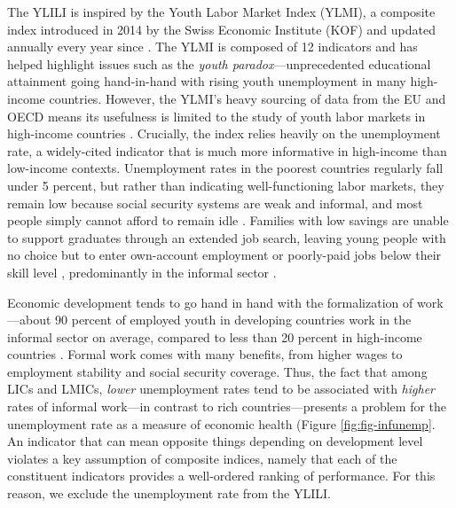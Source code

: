 \documentclass[
  a4paper, twoside, 12pt]{book}
\begin{document}
The YLILI is inspired by the Youth Labor Market Index (YLMI), a composite index introduced in 2014 by the Swiss Economic Institute (KOF) and updated annually every year since \autocite{renold2014}. The YLMI is composed of 12 indicators and has helped highlight issues such as the \emph{youth paradox}---unprecedented educational attainment going hand-in-hand with rising youth unemployment in many high-income countries. However, the YLMI's heavy sourcing of data from the EU and OECD means its usefulness is limited to the study of youth labor markets in high-income countries \autocite{pusterla2015,pusterla2016}. Crucially, the index relies heavily on the unemployment rate, a widely-cited indicator that is much more informative in high-income than low-income contexts. Unemployment rates in the poorest countries regularly fall under 5 percent, but rather than indicating well-functioning labor markets, they remain low because social security systems are weak and informal, and most people simply cannot afford to remain idle \autocite{filmer2014}. Families with low savings are unable to support graduates through an extended job search, leaving young people with no choice but to enter own-account employment or poorly-paid jobs below their skill level \autocite[margolis2014]{fields2012}, predominantly in the informal sector \autocite{herrera2013,sengenberger2011}.

Economic development tends to go hand in hand with the formalization of work \autocite{laporta2014}---about 90 percent of employed youth in developing countries work in the informal sector on average, compared to less than 20 percent in high-income countries \autocite{bonnet2018}. Formal work comes with many benefits, from higher wages to employment stability and social security coverage. Thus, the fact that among LICs and LMICs, \emph{lower} unemployment rates tend to be associated with \emph{higher} rates of informal work---in contrast to rich countries---presents a problem for the unemployment rate as a measure of economic health (Figure \ref{fig:fig-infunemp}. An indicator that can mean opposite things depending on development level violates a key assumption of composite indices, namely that each of the constituent indicators provides a well-ordered ranking of performance. For this reason, we exclude the unemployment rate from the YLILI.
\end{document}
